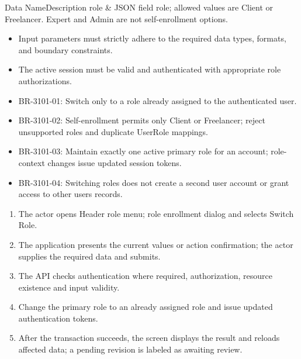 
\begin{specdatatable}{Data Name}{Description}
role & JSON field role; allowed values are Client or Freelancer. Expert and Admin are not self-enrollment options.\\ \hline
\end{specdatatable}

\begin{itemize}[leftmargin=1.6em,topsep=3pt,itemsep=2pt,parsep=0pt,label=$\bullet$]
    \item Input parameters must strictly adhere to the required data types, formats, and boundary constraints.
    \item The active session must be valid and authenticated with appropriate role authorizations.
\end{itemize}

\begin{itemize}[leftmargin=1.6em,topsep=3pt,itemsep=2pt,parsep=0pt,label=$\bullet$]\brrulelist
    \item BR-3101-01: Switch only to a role already assigned to the authenticated user.
    \item BR-3101-02: Self-enrollment permits only Client or Freelancer; reject unsupported roles and duplicate UserRole mappings.
    \item BR-3101-03: Maintain exactly one active primary role for an account; role-context changes issue updated session tokens.
    \item BR-3101-04: Switching roles does not create a second user account or grant access to other users records.
\end{itemize}

\begin{enumerate}[leftmargin=1.8em,topsep=3pt,itemsep=2pt,parsep=0pt]
    \item The actor opens Header role menu; role enrollment dialog and selects Switch Role.
    \item The application presents the current values or action confirmation; the actor supplies the required data and submits.
    \item The API checks authentication where required, authorization, resource existence and input validity.
    \item Change the primary role to an already assigned role and issue updated authentication tokens.
    \item After the transaction succeeds, the screen displays the result and reloads affected data; a pending revision is labeled as awaiting review.
\end{enumerate}


